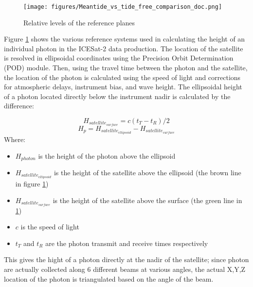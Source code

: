 \begin{figure}[!ht]
      \centering
      \texttt{[image: figures/Meantide\_vs\_tide\_free\_comparison\_doc.png]}
      \caption{Relative levels of the reference planes}
      \label{fig:geoids-ellipsoids-graphics}
\end{figure}

Figure \ref{fig:geoids-ellipsoids-graphics} shows the various reference systems used in calculating the height of an individual photon in the ICESat-2 data production. The location of the satellite is resolved in ellipsoidal coordinates using the Precision Orbit Determination (POD) module. Then, using the travel time between the photon and the satellite, the location of the photon is calculated using the speed of light and corrections for atmospheric delays, instrument bias, and wave height. The ellipsoidal height of a photon located directly below the instrument nadir is calculated by the difference:


\begin{equation}\label{eq:raw_photon_calculation}
      H_{satellite_{surface}} = c(t_T-t_R)/2
\end{equation}
\begin{equation}
      H_p = H_{satellite_{ellipsoid}} - H_{satellite_{surface}}
\end{equation}
Where:
\begin{itemize}
      \item $H_{photon}$ is the height of the photon above the ellipsoid
      \item $H_{satellite_{ellipsoid}}$ is the height of the satellite above the ellipsoid (the brown line in figure \ref{fig:geoids-ellipsoids-graphics})
      \item $H_{satellite_{surface}}$ is the height of the satellite above the surface (the green line in \ref{fig:geoids-ellipsoids-graphics})
      \item $c$ is the speed of light
      \item $t_T$ and $t_R$ are the photon transmit and receive times respectively
\end{itemize}

This gives the hight of a photon directly at the nadir of the satellite; since photon are actually collected along 6 different beams at various angles, the actual X,Y,Z location of the photon is triangulated based on the angle of the beam. 

